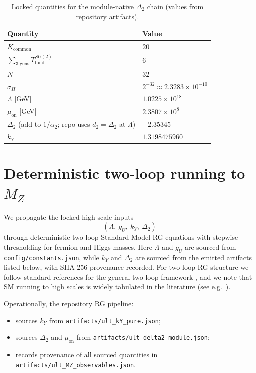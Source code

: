 \documentclass[11pt]{article}
\begin{document}
\begin{table}[h!]
\centering
\caption{Locked quantities for the module-native $\Delta_2$ chain (values from repository artifacts).}
\label{tab:locks}
\begin{tabular}{ll}
\toprule
Quantity & Value \\
\midrule
$K_{\mathrm{common}}$ & $20$ \\
$\sum_{\text{3 gens}} T_{\mathrm{fund}}^{SU(2)}$ & $6$ \\
$N$ & $32$ \\
$\sigma_H$ & $2^{-32}\approx 2.3283\times 10^{-10}$ \\
$\Lambda$ [GeV] & $1.0225\times 10^{18}$ \\
$\mu_{\mathrm{on}}$ [GeV] & $2.3807\times 10^{8}$ \\
$\Delta_2$ (add to $1/\alpha_2$; repo uses $d_2=\Delta_2$ at $\Lambda$) & $-2.35345$ \\
$k_Y$ & $1.3198475960$ \\
\bottomrule
\end{tabular}
\end{table}

\section{Deterministic two-loop running to \texorpdfstring{$M_Z$}{MZ}}
We propagate the locked high-scale inputs
\begin{equation}
(\Lambda,\ g_U,\ k_Y,\ \Delta_2)
\end{equation}
through deterministic two-loop Standard Model RG equations with stepwise thresholding for fermion and Higgs masses. Here $\Lambda$ and $g_U$ are sourced from \texttt{config/constants.json}, while $k_Y$ and $\Delta_2$ are sourced from the emitted artifacts listed below, with SHA-256 provenance recorded. For two-loop RG structure we follow standard references for the general two-loop framework \cite{MachacekVaughn1983,MachacekVaughn1984,MachacekVaughn1985}, and we note that SM running to high scales is widely tabulated in the literature (see e.g.\ \cite{Buttazzo2013}).

Operationally, the repository RG pipeline:
\begin{itemize}
  \item sources $k_Y$ from \texttt{artifacts/ult\_kY\_pure.json};
  \item sources $\Delta_2$ and $\mu_{\mathrm{on}}$ from \texttt{artifacts/ult\_delta2\_module.json};
  \item records provenance of all sourced quantities in \texttt{artifacts/ult\_MZ\_observables.json}.
\end{itemize}
\end{document}
